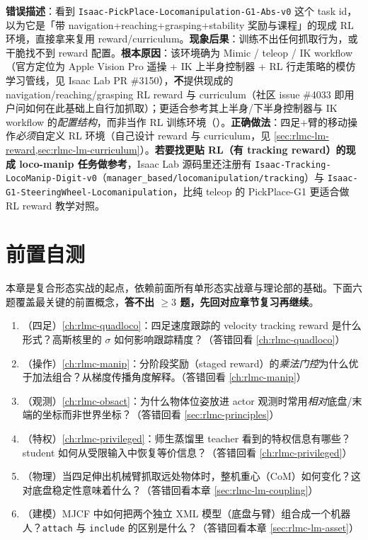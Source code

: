 \begin{pitfall}
\textbf{错误描述}：看到 \verb|Isaac-PickPlace-Locomanipulation-G1-Abs-v0| 这个 task id，以为它是「带 navigation+reaching+grasping+stability 奖励与课程」的现成 RL 环境，直接拿来复用 reward/curriculum。\textbf{现象后果}：训练不出任何抓取行为，或干脆找不到 reward 配置。\textbf{根本原因}：该环境确为 Mimic / teleop / IK workflow（官方定位为 Apple Vision Pro 遥操 + IK 上半身控制器 + RL 行走策略的模仿学习管线，见 Isaac Lab PR \#3150），\textbf{不}提供现成的 navigation/reaching/grasping RL reward 与 curriculum（社区 issue \#4033 即用户问如何在此基础上自行加抓取）；更适合参考其上半身/下半身控制器与 IK workflow 的\emph{配置结构}，而非当作 RL 训练环境（）。\textbf{正确做法}：四足+臂的移动操作\emph{必须}自定义 RL 环境（自己设计 reward 与 curriculum，见 \cref{sec:rlmc-lm-reward,sec:rlmc-lm-curriculum}）。\textbf{若要找更贴 RL（有 tracking reward）的现成 loco-manip 任务做参考}，Isaac Lab 源码里还注册有 \verb|Isaac-Tracking-LocoManip-Digit-v0|（\verb|manager_based/locomanipulation/tracking|）与 \verb|Isaac-G1-SteeringWheel-Locomanipulation|，比纯 teleop 的 PickPlace-G1 更适合做 RL reward 教学对照。
\end{pitfall}

\section{前置自测}
\label{sec:rlmc-lm-pretest}

本章是复合形态实战的起点，依赖前面所有单形态实战章与理论部的基础。下面六题覆盖最关键的前置概念，\textbf{答不出 $\ge 3$ 题，先回对应章节复习再继续}。

\begin{practice}[开课前自测]
\begin{enumerate}
\item （四足）\cref{ch:rlmc-quadloco}：四足速度跟踪的 velocity tracking reward 是什么形式？高斯核里的 $\sigma$ 如何影响跟踪精度？（答错回看 \cref{ch:rlmc-quadloco}）
\item （操作）\cref{ch:rlmc-manip}：分阶段奖励（staged reward）的\emph{乘法门控}为什么优于加法组合？从梯度传播角度解释。（答错回看 \cref{ch:rlmc-manip}）
\item （观测）\cref{ch:rlmc-obsact}：为什么物体位姿放进 actor 观测时常用\emph{相对}底盘/末端的坐标而非世界坐标？（答错回看 \cref{sec:rlmc-principles}）
\item （特权）\cref{ch:rlmc-privileged}：师生蒸馏里 teacher 看到的特权信息有哪些？student 如何从受限输入中恢复等价信息？（答错回看 \cref{ch:rlmc-privileged}）
\item （物理）当四足伸出机械臂抓取远处物体时，整机重心（CoM）如何变化？这对底盘稳定性意味着什么？（答错回看本章 \cref{sec:rlmc-lm-coupling}）
\item （建模）MJCF 中如何把两个独立 XML 模型（底盘与臂）组合成一个机器人？\verb|attach| 与 \verb|include| 的区别是什么？（答错回看本章 \cref{sec:rlmc-lm-asset}）
\end{enumerate}
\end{practice}

